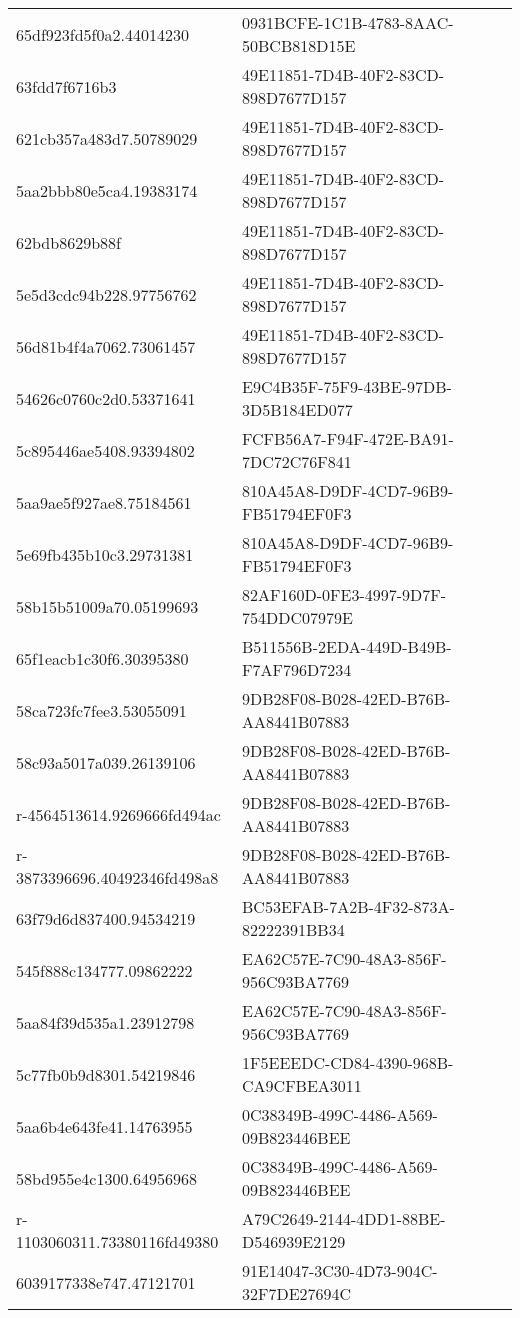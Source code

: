\begin{tabular}{ll}
65df923fd5f0a2.44014230 & 0931BCFE-1C1B-4783-8AAC-50BCB818D15E \\
63fdd7f6716b3 & 49E11851-7D4B-40F2-83CD-898D7677D157 \\
621cb357a483d7.50789029 & 49E11851-7D4B-40F2-83CD-898D7677D157 \\
5aa2bbb80e5ca4.19383174 & 49E11851-7D4B-40F2-83CD-898D7677D157 \\
62bdb8629b88f & 49E11851-7D4B-40F2-83CD-898D7677D157 \\
5e5d3cdc94b228.97756762 & 49E11851-7D4B-40F2-83CD-898D7677D157 \\
56d81b4f4a7062.73061457 & 49E11851-7D4B-40F2-83CD-898D7677D157 \\
54626c0760c2d0.53371641 & E9C4B35F-75F9-43BE-97DB-3D5B184ED077 \\
5c895446ae5408.93394802 & FCFB56A7-F94F-472E-BA91-7DC72C76F841 \\
5aa9ae5f927ae8.75184561 & 810A45A8-D9DF-4CD7-96B9-FB51794EF0F3 \\
5e69fb435b10c3.29731381 & 810A45A8-D9DF-4CD7-96B9-FB51794EF0F3 \\
58b15b51009a70.05199693 & 82AF160D-0FE3-4997-9D7F-754DDC07979E \\
65f1eacb1c30f6.30395380 & B511556B-2EDA-449D-B49B-F7AF796D7234 \\
58ca723fc7fee3.53055091 & 9DB28F08-B028-42ED-B76B-AA8441B07883 \\
58c93a5017a039.26139106 & 9DB28F08-B028-42ED-B76B-AA8441B07883 \\
r-4564513614.9269666fd494ac & 9DB28F08-B028-42ED-B76B-AA8441B07883 \\
r-3873396696.40492346fd498a8 & 9DB28F08-B028-42ED-B76B-AA8441B07883 \\
63f79d6d837400.94534219 & BC53EFAB-7A2B-4F32-873A-82222391BB34 \\
545f888c134777.09862222 & EA62C57E-7C90-48A3-856F-956C93BA7769 \\
5aa84f39d535a1.23912798 & EA62C57E-7C90-48A3-856F-956C93BA7769 \\
5c77fb0b9d8301.54219846 & 1F5EEEDC-CD84-4390-968B-CA9CFBEA3011 \\
5aa6b4e643fe41.14763955 & 0C38349B-499C-4486-A569-09B823446BEE \\
58bd955e4c1300.64956968 & 0C38349B-499C-4486-A569-09B823446BEE \\
r-1103060311.73380116fd49380 & A79C2649-2144-4DD1-88BE-D546939E2129 \\
6039177338e747.47121701 & 91E14047-3C30-4D73-904C-32F7DE27694C \\

\end{tabular}
